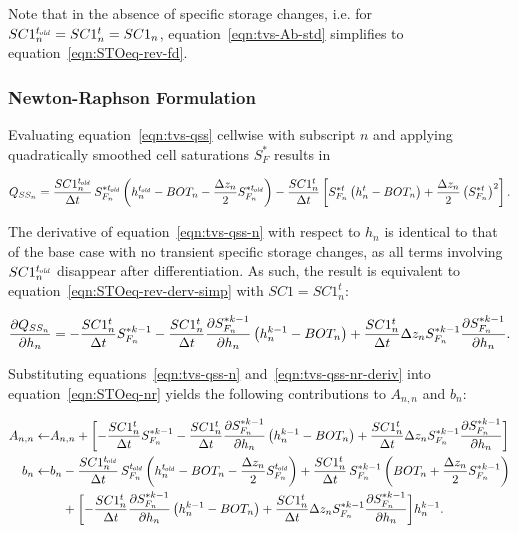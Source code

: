 \noindent Note that in the absence of specific storage changes, i.e. for $SC1_n^{t_\mathit{\kern -0.07em old}} = SC1_n^t = SC1_n$, equation~\ref{eqn:tvs-Ab-std} simplifies to equation~\ref{eqn:STOeq-rev-fd}.


\subsubsection{Newton-Raphson Formulation}

Evaluating equation~\ref{eqn:tvs-qss} cellwise with subscript $n$ and applying quadratically smoothed cell saturations $S_F^*$ results in

\begin{equation}
	\label{eqn:tvs-qss-n}
	Q_{SS_n} = \frac{SC1_n^{t_\mathit{\kern -0.07em old}}}{\Delta t} \, S_{F_n}^{\ast t_\mathit{\kern -0.07em old}} \left( h_n^{t_\mathit{\kern -0.07em old}} - BOT_n - \frac{\Delta z_n}{2} S_{F_n}^{\ast t_\mathit{\kern -0.07em old}} \right) - \frac{SC1_n^t}{\Delta t} \left[ S_{F_n}^{\ast t} \left( h_n^t - BOT_n \right) + \frac{\Delta z_n}{2} \left( S_{F_n}^{\ast t} \right)^2 \right] .
\end{equation}

\noindent The derivative of equation~\ref{eqn:tvs-qss-n} with respect to $h_n$ is identical to that of the base case with no transient specific storage changes, as all terms involving $SC1_n^{t_\mathit{\kern -0.07em old}}$ disappear after differentiation. As such, the result is equivalent to equation~\ref{eqn:STOeq-rev-derv-simp} with $SC1 = SC1_n^t$:

\begin{equation}
	\label{eqn:tvs-qss-nr-deriv}
	\frac{\partial Q_{SS_n}}{\partial h_n} = -\frac{SC1_n^t}{\Delta t} S_{F_n}^{\ast k-1} - \frac{SC1_n^t}{\Delta t} \frac{\partial S_{F_n}^{\ast k-1}}{\partial h_n} \left( h_n^{k-1} - BOT_n \right) + \frac{SC1_n^t}{\Delta t} \Delta z_n S_{F_n}^{\ast k-1}  \frac{\partial S_{F_n}^{\ast k-1}}{\partial h_n} .
\end{equation}

\noindent Substituting equations~\ref{eqn:tvs-qss-n} and~\ref{eqn:tvs-qss-nr-deriv} into equation~\ref{eqn:STOeq-nr} yields the following contributions to $A_{n,n}$ and $b_n$:

\begin{equation}
	\label{eqn:tvs-Ab-nr}
	\begin{aligned}
		A_{n,n} \leftarrow & A_{n,n} + \biggl[ - \frac{SC1_n^t}{\Delta t} S_{F_n}^{\ast k-1} - \frac{SC1_n^t}{\Delta t} \frac{\partial S_{F_n}^{\ast k-1}}{\partial h_n} \left( h_n^{k-1} - BOT_n \right) + \frac{SC1_n^t}{\Delta t} \Delta z_n S_{F_n}^{\ast k-1}  \frac{\partial S_{F_n}^{\ast k-1}}{\partial h_n} \biggr] \\
		b_n \leftarrow & b_n - \frac{SC1_n^{t_\mathit{\kern -0.07em old}}}{\Delta t} \, S_{F_n}^{t_\mathit{\kern -0.07em old}} \left( h_n^{t_\mathit{\kern -0.07em old}} - BOT_n - \frac{\Delta z_n}{2} S_{F_n}^{t_\mathit{\kern -0.07em old}} \right) + \frac{SC1_n^t}{\Delta t} \, S_{F_n}^{\ast k-1} \left( BOT_n + \frac{\Delta z_n}{2} S_{F_n}^{\ast k-1} \right) \\
		& \phantom{b_n} + \biggl[ - \frac{SC1_n^t}{\Delta t} \frac{\partial S_{F_n}^{\ast k-1}}{\partial h_n} \left( h_n^{k-1} - BOT_n \right) + \frac{SC1_n^t}{\Delta t} \Delta z_n S_{F_n}^{\ast k-1}  \frac{\partial S_{F_n}^{\ast k-1}}{\partial h_n} \biggr] h_n^{k-1} .
	\end{aligned}
\end{equation}


